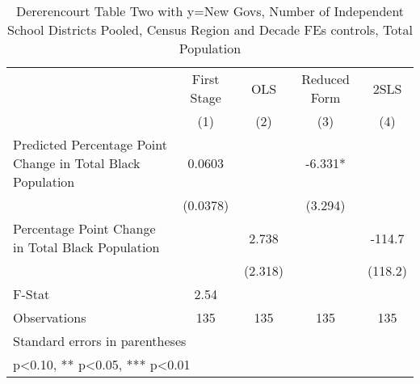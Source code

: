 \begin{table}[htbp]\centering
\def\sym#1{\ifmmode^{#1}\else\(^{#1}\)\fi}
\caption{Dererencourt Table Two with y=New Govs, Number of Independent School Districts  Pooled, Census Region and Decade FEs controls, Total Population}
\begin{tabular}{l*{4}{c}}
\toprule
                    & First Stage   &         OLS   &Reduced Form   &        2SLS   \\
                    &\multicolumn{1}{c}{(1)}   &\multicolumn{1}{c}{(2)}   &\multicolumn{1}{c}{(3)}   &\multicolumn{1}{c}{(4)}   \\
\midrule
Predicted Percentage Point Change in Total Black Population&      0.0603   &               &      -6.331*  &               \\
                    &    (0.0378)   &               &     (3.294)   &               \\
\addlinespace
Percentage Point Change in Total Black Population&               &       2.738   &               &      -114.7   \\
                    &               &     (2.318)   &               &     (118.2)   \\
\midrule
F-Stat              &        2.54   &               &               &               \\
Observations        &         135   &         135   &         135   &         135   \\
\bottomrule
\multicolumn{5}{l}{\footnotesize Standard errors in parentheses}\\
\multicolumn{5}{l}{\footnotesize * p<0.10, ** p<0.05, *** p<0.01}\\
\end{tabular}
\end{table}
